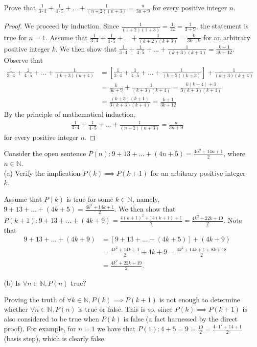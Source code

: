 \documentclass[12pt]{article}
\newcommand{\N}{\mathbb{N}}
\newenvironment{problem}[2][Problem]{\begin{trivlist}
		\item[\hskip \labelsep {\bfseries #1}\hskip \labelsep {\bfseries #2.}]}{\end{trivlist}}
\newenvironment{solution}[2][Solution]{\begin{trivlist}
		\item[\hskip \labelsep {\bfseries #1}\hskip \labelsep {\bfseries #2.}]}{\end{trivlist}}
\begin{document}
\begin{problem}{11}
	Prove that $\frac{1}{3\cdot 4}+\frac{1}{4\cdot 5}+\ldots+\frac{1}{(n+2)(n+3)}=\frac{n}{3n+9}$ for every positive integer $n$.
	\begin{proof}
		We proceed by induction. Since $\frac{1}{(1+2)(1+3)}=\frac{1}{12}=\frac{1}{3+9}$, the statement is true for $n=1$. Assume that $\frac{1}{3\cdot 4}+\frac{1}{4\cdot 5}+\ldots+\frac{1}{(k+2)(k+3)}=\frac{k}{3k+9}$ for an arbitrary positive integer $k$. We then show that $\frac{1}{3\cdot 4}+\frac{1}{4\cdot 5}+\ldots+\frac{1}{(k+3)(k+4)}=\frac{k+1}{3k+12}$. Observe that
		\begin{align*}
			\frac{1}{3\cdot 4}+\frac{1}{4\cdot 5}+\ldots+\frac{1}{(k+3)(k+4)} &= \left[\frac{1}{3\cdot 4}+\frac{1}{4\cdot 5}+\ldots+\frac{1}{(k+2)(k+3)}\right]+\frac{1}{(k+3)(k+4)}\\
			&= \frac{k}{3k+9} + \frac{1}{(k+3)(k+4)} = \frac{k(k+4)+3}{3(k+3)(k+4)}\\
			&= \frac{(k+3)(k+1)}{3(k+3)(k+4)} = \frac{k+1}{3k+12}
		\end{align*}
	By the principle of mathematical induction,
	\begin{align*}
		\frac{1}{3\cdot 4}+\frac{1}{4\cdot 5}+\ldots+\frac{1}{(n+2)(n+3)}=\frac{n}{3n+9}
	\end{align*}
	for every positive integer $n$.
	\end{proof}
\end{problem}

\begin{problem}{12}
	Consider the open sentence $P(n):9+13+\ldots+(4n+5)=\frac{4n^{2}+14n+1}{2}$, where $n\in \N$.\\
	
	(a) Verify the implication $P(k)\implies P(k+1)$ for an arbitrary positive integer $k$.
	\begin{solution}{}
		Assume that $P(k)$ is true for some $k \in \N$, namely, $9+13+\ldots+(4k+5)=\frac{4k^{2}+14k+1}{2}$. We then show that $P(k+1): 9+13+\ldots+(4k+9)=\frac{4(k+1)^{2}+14(k+1)+1}{2} = \frac{4k^{2}+22k+19}{2}$. Note that
		\begin{align*}
			9+13+\ldots+(4k+9) &= [9+13+\ldots+(4k+5)]+(4k+9)\\
			&= \frac{4k^{2}+14k+1}{2} + 4k+9 = \frac{4k^{2}+14k+1+8k+18}{2}\\
			&= \frac{4k^{2}+22k+19}{2}.
		\end{align*}
	\end{solution}
	(b) Is $\forall n \in \N, P(n)$ true?
	\begin{solution}{}
		Proving the truth of $\forall k \in \N, P(k)\implies P(k+1)$ is not enough to determine whether $\forall n \in \N, P(n)$ is true or false. This is so, since $P(k)\implies P(k+1)$ is also considered to be true when $P(k)$ is false (a fact harnessed by the direct proof). For example, for $n=1$ we have that $P(1):4+5=9= \frac{19}{2} = \frac{4\cdot 1^{2} +14+1}{2}$ (basis step), which is clearly false.
	\end{solution}
\end{problem}
\end{document}
